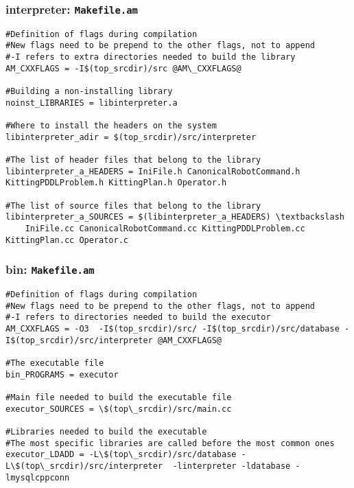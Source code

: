\subsubsection{interpreter: \texttt{Makefile.am}}
\begin{minipage}{.5\paperwidth}
\begin{mylisting}
\begin{Verbatim}[commandchars=\\\{\},fontsize=\scriptsize, numbersep=2pt]
#Definition of flags during compilation
#New flags need to be prepend to the other flags, not to append
#-I refers to extra directories needed to build the library
AM_CXXFLAGS = -I$(top_srcdir)/src @AM\_CXXFLAGS@

#Building a non-installing library
noinst_LIBRARIES = libinterpreter.a

#Where to install the headers on the system
libinterpreter_adir = $(top_srcdir)/src/interpreter

#The list of header files that belong to the library
libinterpreter_a_HEADERS = IniFile.h CanonicalRobotCommand.h KittingPDDLProblem.h KittingPlan.h Operator.h

#The list of source files that belong to the library
libinterpreter_a_SOURCES = $(libinterpreter_a_HEADERS) \textbackslash
	IniFile.cc CanonicalRobotCommand.cc KittingPDDLProblem.cc KittingPlan.cc Operator.c
\end{Verbatim}
\end{mylisting}
\end{minipage}
\subsubsection{bin: \texttt{Makefile.am}}

\begin{minipage}{.5\paperwidth}
\begin{mylisting}
\begin{Verbatim}[commandchars=\\\{\},fontsize=\scriptsize, numbersep=2pt]
#Definition of flags during compilation
#New flags need to be prepend to the other flags, not to append
#-I refers to directories needed to build the executor
AM_CXXFLAGS = -O3  -I$(top_srcdir)/src/ -I$(top_srcdir)/src/database -I$(top_srcdir)/src/interpreter @AM_CXXFLAGS@

#The executable file
bin_PROGRAMS = executor

#Main file needed to build the executable file
executor_SOURCES = \$(top\_srcdir)/src/main.cc

#Libraries needed to build the executable
#The most specific libraries are called before the most common ones
executor_LDADD = -L\$(top\_srcdir)/src/database -L\$(top\_srcdir)/src/interpreter  -linterpreter -ldatabase -lmysqlcppconn
\end{Verbatim}
\end{mylisting}
\end{minipage}

